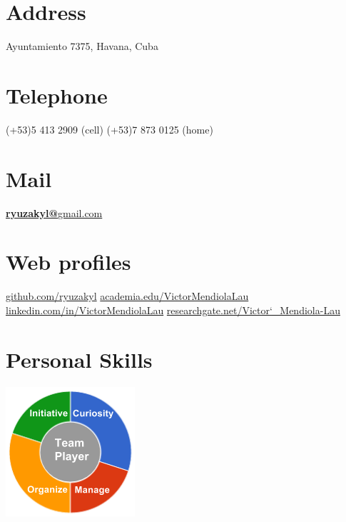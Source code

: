 \documentclass[]{friggeri-cv}
\begin{document}
      

\begin{aside}
  \section{Address}
    Ayuntamiento 7375, 
    Havana, Cuba
    ~
    ~
    ~
  \section{Telephone}
    (+53)5 413 2909 (cell)
  	(+53)7 873 0125 (home)
    ~
    ~
    ~
  \section{Mail}
    \href{mailto:ryuzakyl@gmail.com}{\textbf{ryuzakyl@}gmail.com}
	~
	~    
    ~
  \section{Web profiles}
    \href{https://github.com/ryuzakyl}{{\scriptsize github.com/ryuzakyl}}
    \href{https://independent.academia.edu/VictorMendiolaLau}{{\scriptsize academia.edu/VictorMendiolaLau}}
    \href{https://www.linkedin.com/in/VictorMendiolaLau}{{\scriptsize linkedin.com/in/VictorMendiolaLau}}
	\href{https://www.researchgate.net/profile/Victor_Mendiola-Lau}{{\scriptsize researchgate.net/Victor\char`_Mendiola-Lau}}
    ~
    ~
    ~
  \section{Personal Skills}
    \includegraphics[scale=0.62]{img/personal.png}
    ~
\end{aside}
\end{document}
